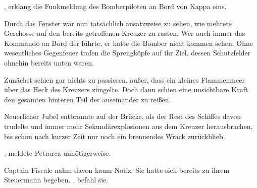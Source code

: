 , erklang die Funkmeldung des Bomberpiloten an Bord von Kappa eins. 

\par

Durch das Fenster war nun tatsächlich ansatzweise zu sehen, wie mehrere Geschosse auf den bereits getroffenen Kreuzer zu rasten. Wer auch immer das Kommando an Bord der  führte, er hatte die Bomber nicht kommen sehen. Ohne wesentliches Gegenfeuer trafen die Sprengköpfe auf ihr Ziel, dessen Schutzfelder ohnehin bereits unten waren.

\par

Zunächst schien gar nichts zu passieren, außer, dass ein kleines Flammenmeer über das Heck des Kreuzers züngelte. Doch dann schien eine unsichtbare Kraft den gesamten hinteren Teil der  auseinander zu reißen.

\par

Neuerlicher Jubel entbrannte auf der Brücke, als der Rest des Schiffes davon trudelte und immer mehr Sekundärexplosionen aus dem Kreuzer herausbrachen, bis schon nach kurzer Zeit nur noch ein brennendes Wrack zurückblieb.

\par

, meldete Petrarca unnötigerweise.

\par

Captain Fiscale nahm davon kaum Notiz. Sie hatte sich bereits zu ihrem Steuermann begeben. , befahl sie. 